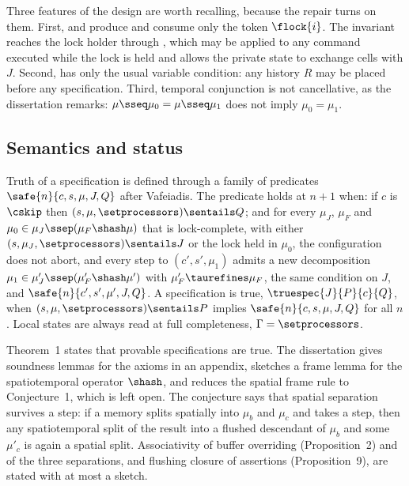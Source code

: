 Three features of the design are worth recalling, because the repair turns
on them. First,  and  produce and consume only the
token $\flock{i}$. The invariant reaches the lock holder through ,
which may be applied to any command executed while the lock is held and
allows the private state to exchange cells with $J$. Second, 
has only the usual variable condition: any history $R$ may be placed before
any specification. Third, temporal conjunction is not cancellative, as the
dissertation remarks: $\mu \sseq \mu_0 = \mu \sseq \mu_1$ does not imply
$\mu_0 = \mu_1$.

\subsection{Semantics and status}

Truth of a specification is defined through a family of predicates
$\safe{n}{c,s,\mu,J,Q}$ after Vafeiadis. The predicate holds at $n+1$ when:
if $c$ is $\cskip$ then $(s,\mu,\setprocessors) \sentails Q$; and for every
$\mu_J$, $\mu_F$ and $\mu_0 \in \mu_J \ssep (\mu_F \shash \mu)$ that is
lock-complete, with either $(s,\mu_J,\setprocessors) \sentails J$ or the
lock held in $\mu_0$, the configuration does not abort, and every step to
$(c',s',\mu_1)$ admits a new decomposition
$\mu_1 \in \mu'_J \ssep (\mu'_F \shash \mu')$ with
$\mu'_F \taurefines \mu_F$, the same condition on $J$, and
$\safe{n}{c',s',\mu',J,Q}$. A specification is true,
$\truespec{J}{P}{c}{Q}$, when $(s,\mu,\setprocessors) \sentails P$ implies
$\safe{n}{c,s,\mu,J,Q}$ for all $n$. Local states are always read at full
completeness, $\Gamma = \setprocessors$.

Theorem~1 states that provable specifications are true. The dissertation
gives soundness lemmas for the axioms in an appendix, sketches a frame lemma for the
spatiotemporal operator $\shash$, and reduces the spatial frame rule to Conjecture~1, which is left open.
The conjecture says that spatial separation survives a step: if a memory
splits spatially into $\mu_b$ and $\mu_c$ and takes a step, then any
spatiotemporal split of the result into a flushed descendant of $\mu_b$ and
some $\mu'_c$ is again a spatial split. Associativity of buffer overriding
(Proposition~2) and of the three separations, and flushing closure of
assertions (Proposition~9), are stated with at most a sketch.
